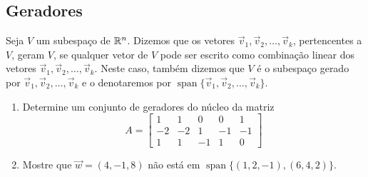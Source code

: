 \subsection*{Geradores}
\begin{frame}[label=lild]{}
\begin{defin}
Seja $V$ um subespaço de $\mathbb{R}^n$. Dizemos que os vetores $\vec{v}_1,\vec{v}_2,\ldots,\vec{v}_k$, pertencentes a $V$, {\color{blue}geram} $V$, se qualquer vetor de $V$ pode ser escrito como combinação linear dos vetores $\vec{v}_1,\vec{v}_2,\ldots,\vec{v}_k$. Neste caso, também dizemos que $V$ é o {\color{blue}subespaço gerado por} $\vec{v}_1,\vec{v}_2,\ldots,\vec{v}_k$ e o denotaremos por $\operatorname{span}\{\vec{v}_1,\vec{v}_2,\ldots,\vec{v}_k\}$.
\end{defin}

\begin{exe}
\begin{enumerate}
\item Determine um conjunto de geradores do núcleo da matriz 
\[A=
\begin{bmatrix}
1 &1 & 0 &0 &1\\
-2 & -2 & 1& -1 & -1 \\
1&1& -1 &1&0
\end{bmatrix}
\]

\item Mostre que $\vec{w}=(4,-1,8)$ não está em $\operatorname{span}\{(1,2,-1),(6,4,2)\}$.
\end{enumerate}
\end{exe}
%

\end{frame}

